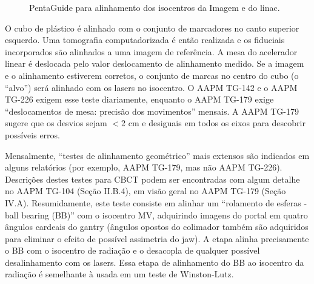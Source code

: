 \documentclass[11pt,a4paper]{article}
\newcounter{exemplo}
\begin{document}
    \begin{figure}[h]
        \centering
        \caption{PentaGuide para alinhamento dos isocentros da Imagem e do linac.}
        \label{fig:pentaguide}
    \end{figure}
    

    O cubo de plástico é alinhado com o conjunto de marcadores no canto superior esquerdo. Uma tomografia computadorizada é então realizada e os fiduciais incorporados são alinhados a uma imagem de referência. A mesa do acelerador linear é deslocada pelo valor deslocamento de alinhamento medido. Se a imagem e o alinhamento estiverem corretos, o conjunto de marcas no centro do cubo (o “alvo”) será alinhado com os lasers no isocentro. O AAPM TG-142 e o AAPM TG-226 exigem esse teste diariamente, enquanto o AAPM TG-179 exige “deslocamentos de mesa: precisão dos movimentos” mensais. A AAPM TG-179 sugere que os desvios sejam $<$2 cm e desiguais em todos os eixos para descobrir possíveis erros.

    Mensalmente, “testes de alinhamento geométrico” mais extensos são indicados em alguns relatórios (por exemplo, AAPM TG-179, mas não AAPM TG-226). Descrições destes testes para CBCT podem ser encontradas com algum detalhe no AAPM TG-104 (Seção II.B.4), em visão geral no AAPM TG-179 (Seção IV.A). Resumidamente, este teste consiste em alinhar um “rolamento de esferas - ball bearing (BB)” com o isocentro MV, adquirindo imagens do portal em quatro ângulos cardeais do gantry (ângulos opostos do colimador também são adquiridos para eliminar o efeito de possível assimetria do jaw). A etapa alinha precisamente o BB com o isocentro de radiação e o desacopla de qualquer possível desalinhamento com os lasers. Essa etapa de alinhamento do BB ao isocentro da radiação é semelhante à usada em um teste de Winston-Lutz.
\end{document}
